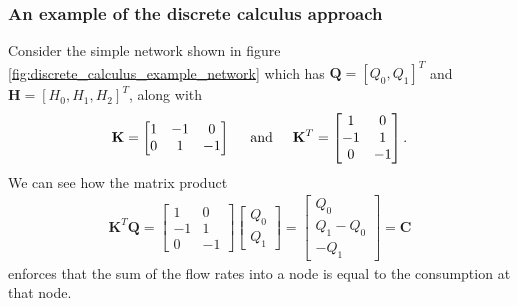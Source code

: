 \subsubsection{An example of the discrete calculus approach}

Consider the simple network shown in figure \ref{fig:discrete_calculus_example_network} which has $\mathbf{Q} = [Q_0, Q_1]^T$ and $\mathbf{H} = [H_0, H_1, H_2]^T$, along with
\begin{align*}
\mathbf{K} = \begin{bmatrix}
1 & -1 & 0 \\
0 & 1 & -1
\end{bmatrix}
\hspace{0.5cm} \text{and} \hspace{0.5cm} \mathbf{K}^T = \begin{bmatrix}
1 & 0  \\
-1 & 1 \\
0 & -1
\end{bmatrix}.
\end{align*}
We can see how the matrix product 
\begin{align*}
\mathbf{K}^T \mathbf{Q} = \begin{bmatrix}
1 & 0  \\
-1 & 1 \\
0 & -1
\end{bmatrix} \begin{bmatrix}
Q_0 \\ Q_1
\end{bmatrix} = \begin{bmatrix}
Q_0 \\ Q_1 - Q_0 \\ -Q_1
\end{bmatrix} = \mathbf{C}
\end{align*}
enforces that the sum of the flow rates into a node is equal to the consumption at that node. 

